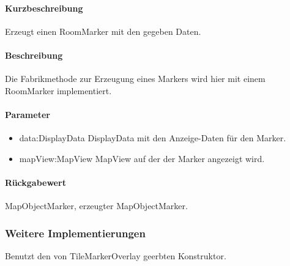 \paragraph*{Kurzbeschreibung}
Erzeugt einen RoomMarker mit den gegeben Daten.
\paragraph*{Beschreibung}
Die Fabrikmethode zur Erzeugung eines Markers wird hier mit einem RoomMarker implementiert.
\paragraph*{Parameter}
\begin{itemize}
    \item data:DisplayData DisplayData mit den Anzeige-Daten für den Marker.
    \item mapView:MapView MapView auf der der Marker angezeigt wird.
\end{itemize}
\paragraph*{Rückgabewert}
MapObjectMarker, erzeugter MapObjectMarker.

\subsubsection{Weitere Implementierungen}%
Benutzt den von TileMarkerOverlay geerbten Konstruktor.